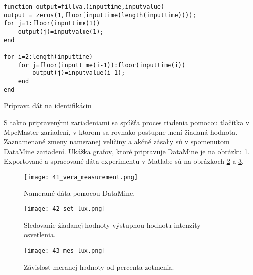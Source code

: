 \begin{algorithm}
%
\begin{lstlisting}
function output=fillval(inputtime,inputvalue)
output = zeros(1,floor(inputtime(length(inputtime))));
for j=1:floor(inputtime(1))
    output(j)=inputvalue(1);
end

for i=2:length(inputtime)
    for j=floor(inputtime(i-1)):floor(inputtime(i))
        output(j)=inputvalue(i-1);
    end
end
\end{lstlisting}
 \caption{Príprava dát na identifikáciu}
 \label{alg05}
\end{algorithm} 
 
S takto pripravenými zariadeniami sa spúšťa proces riadenia pomocou tlačítka v MpcMaster zariadení, v ktorom sa rovnako postupne mení žiadaná hodnota. Zaznamenané zmeny nameranej veličiny a akčné zásahy sú v spomenutom DataMine zariadení. Ukážka grafov, ktoré pripravuje DataMine je na obrázku  \ref{41_vera_measurement}. Exportované a spracované dáta experimentu v Matlabe sú na obrázkoch \ref{42_set_lux} a \ref{43_mes_lux}.

\begin{figure}[!htbp]
\centering
\texttt{[image: 41\_vera\_measurement.png]}
\caption{Namerané dáta pomocou DataMine.}
\label{41_vera_measurement}
\end{figure}

\begin{figure}[!htbp]
\centering
\texttt{[image: 42\_set\_lux.png]}
\caption{Sledovanie žiadanej hodnoty výstupnou hodnotu intenzity osvetlenia.}
\label{42_set_lux}
\end{figure}


\begin{figure}[!htbp]
\centering
\texttt{[image: 43\_mes\_lux.png]}
\caption{Závislosť meranej hodnoty od percenta zotmenia.}
\label{43_mes_lux}
\end{figure}


